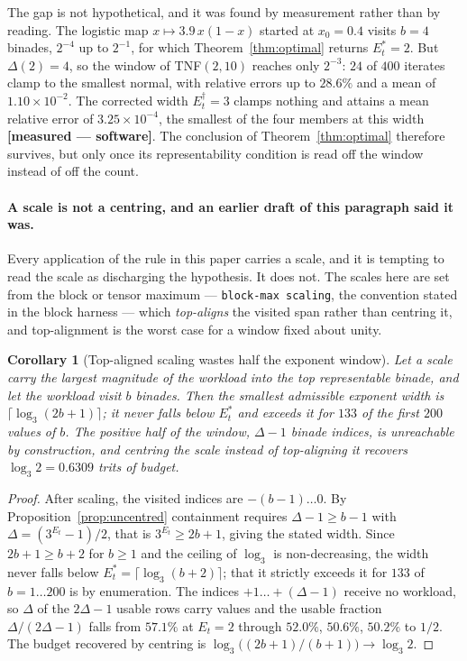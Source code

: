 \documentclass[11pt]{article}
\newtheorem{corollary}{Corollary}
\theoremstyle{definition}
\begin{document}
The gap is not hypothetical, and it was found by measurement rather than by
reading. The logistic map $x \mapsto 3.9\,x(1-x)$ started at $x_0 = 0.4$ visits
$b=4$ binades, $2^{-4}$ up to $2^{-1}$, for which Theorem~\ref{thm:optimal}
returns $E_t^{*}=2$. But $\Delta(2)=4$, so the window of TNF$(2,10)$ reaches only
$2^{-3}$: $24$ of $400$ iterates clamp to the smallest normal, with relative
errors up to $28.6\%$ and a mean of $1.10\times10^{-2}$. The corrected width
$E_t^{\dagger}=3$ clamps nothing and attains a mean relative error of
$3.25\times10^{-4}$, the smallest of the four members at this width
\textbf{[measured --- software]}. The conclusion of Theorem~\ref{thm:optimal}
therefore survives, but only once its representability condition is read off the
window instead of off the count.

\paragraph{A scale is not a centring, and an earlier draft of this paragraph said
it was.} Every application of the rule in this paper carries a scale, and it is
tempting to read the scale as discharging the hypothesis. It does not. The scales
here are set from the block or tensor maximum --- \texttt{block-max scaling}, the
convention stated in the block harness --- which \emph{top-aligns} the visited
span rather than centring it, and top-alignment is the worst case for a window
fixed about unity.

\begin{corollary}[Top-aligned scaling wastes half the exponent window]
\label{cor:topaligned}
Let a scale carry the largest magnitude of the workload into the top representable
binade, and let the workload visit $b$ binades. Then the smallest admissible
exponent width is $\lceil \log_3(2b+1) \rceil$; it never falls below $E_t^{*}$ and
exceeds it for $133$ of the first $200$ values of $b$. The positive half of the
window, $\Delta-1$ binade indices, is unreachable by construction, and centring
the scale instead of top-aligning it recovers $\log_3 2 = 0.6309$ trits of budget.
\end{corollary}

\begin{proof}
After scaling, the visited indices are $-(b-1) \ldots 0$. By
Proposition~\ref{prop:uncentred} containment requires $\Delta - 1 \ge b-1$ with
$\Delta = (3^{E_t}-1)/2$, that is $3^{E_t} \ge 2b+1$, giving the stated width.
Since $2b+1 \ge b+2$ for $b \ge 1$ and the ceiling of $\log_3$ is non-decreasing,
the width never falls below $E_t^{*} = \lceil\log_3(b+2)\rceil$; that it strictly
exceeds it for $133$ of $b = 1 \ldots 200$ is by enumeration. The indices
$+1 \ldots +(\Delta-1)$ receive no workload, so $\Delta$ of the $2\Delta-1$ usable
rows carry values and the usable fraction $\Delta/(2\Delta-1)$ falls from
$57.1\%$ at $E_t=2$ through $52.0\%$, $50.6\%$, $50.2\%$ to $1/2$. The budget
recovered by centring is $\log_3\bigl((2b+1)/(b+1)\bigr) \to \log_3 2$.
\end{proof}
\end{document}
